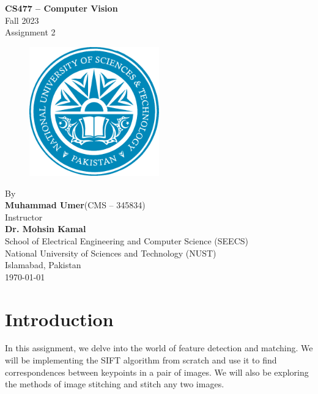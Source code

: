 \documentclass[11pt,a4paper]{article}
\begin{document}
\newpage
\begin{titlepage}
  \vspace*{\fill} %
  \centering
  \huge{\textbf{CS477 -- Computer Vision}} \\
  \huge{Fall 2023} \\
  \huge{Assignment 2} \\ [0.75cm]
  \begin{figure}[ht!]
    \centering
    \includegraphics[width=0.5\textwidth]{figs/nust.pdf}
  \end{figure}
  \vspace {0.75cm}
  \Large{By} \\
  \Large{\textbf{Muhammad Umer}\quad(CMS -- 345834)} \\ [0.75cm]
  \Large{Instructor} \\
  \Large{\textbf{Dr. Mohsin Kamal}} \\[0.75cm]
  \Large{School of Electrical Engineering and Computer Science (SEECS) \\
    National University of Sciences and Technology (NUST) \\
    Islamabad, Pakistan} \\ [0.75cm]
  \Large{\today}
  \vspace*{\fill} %
\end{titlepage}

\tableofcontents

\newpage
\setcounter{page}{1}
\section{Introduction}

In this assignment, we delve into the world of feature detection and matching. We will be implementing the SIFT algorithm from scratch and use it to find correspondences between keypoints in a pair of images. We will also be exploring the methods of image stitching and stitch any two images.
\end{document}
